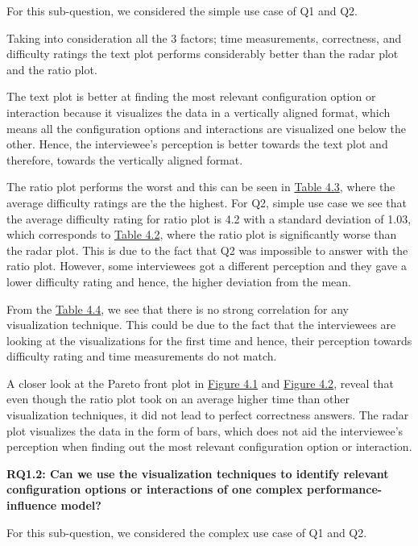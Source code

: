 For this sub-question, we considered the simple use case of Q1 and Q2.

Taking into consideration all the 3 factors; time measurements, correctness, and difficulty ratings the text plot performs considerably better than the radar plot and the ratio plot.

The text plot is better at finding the most relevant configuration option or interaction because it visualizes the data in a vertically aligned format, which means all the configuration options and interactions are visualized one below the other. Hence, the interviewee's perception is better towards the text plot and therefore, towards the vertically aligned format. 

The ratio plot performs the worst and this can be seen in  \hyperref[table:rating]{Table 4.3}, where the average difficulty ratings are the the highest. For Q2, simple use case we see that the average difficulty rating for ratio plot is 4.2 with a standard deviation of 1.03, which corresponds to \hyperref[table:time]{Table 4.2}, where the ratio plot is significantly worse than the radar plot. This is due to the fact that Q2 was impossible to answer with the ratio plot. However, some interviewees got a different perception and they gave a lower difficulty rating and hence, the higher deviation from the mean. 

From the \hyperref[table:pearons]{Table 4.4}, we see that there is no strong correlation for any visualization technique. This could be due to the fact that the interviewees are looking at the visualizations for the first time and hence, their perception towards difficulty rating and time measurements do not match.

A closer look at the Pareto front plot in \hyperref[figure:paretoOneQ1]{Figure 4.1} and \hyperref[figure:paretoOneQ2]{Figure 4.2}, reveal that even though the ratio plot took on an average higher time than other visualization techniques, it did not lead to perfect correctness answers. The radar plot visualizes the data in the form of bars, which does not aid the interviewee's perception when finding out the most relevant configuration option or interaction. 

\vskip 0.2in
\begin{mdframed}
\textbf{RQ1.2: Can we use the visualization techniques to identify relevant configuration options or interactions  of one complex performance-influence model?}
\end{mdframed}

For this sub-question, we considered the complex use case of Q1 and Q2.

